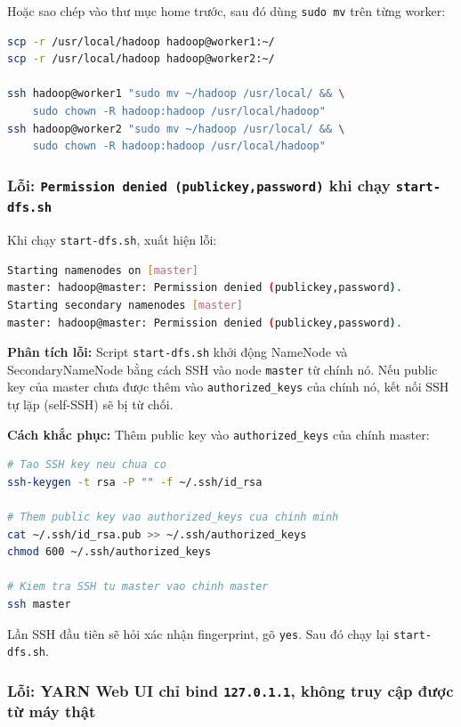 Hoặc sao chép vào thư mục home trước, sau đó dùng \texttt{sudo mv} trên từng worker:

\begin{lstlisting}[language=bash, numbers=none]
scp -r /usr/local/hadoop hadoop@worker1:~/
scp -r /usr/local/hadoop hadoop@worker2:~/

ssh hadoop@worker1 "sudo mv ~/hadoop /usr/local/ && \
    sudo chown -R hadoop:hadoop /usr/local/hadoop"
ssh hadoop@worker2 "sudo mv ~/hadoop /usr/local/ && \
    sudo chown -R hadoop:hadoop /usr/local/hadoop"
\end{lstlisting}

\subsubsection{Lỗi: \texttt{Permission denied (publickey,password)} khi chạy \texttt{start-dfs.sh}}

Khi chạy \texttt{start-dfs.sh}, xuất hiện lỗi:

\begin{lstlisting}[language=bash, numbers=none]
Starting namenodes on [master]
master: hadoop@master: Permission denied (publickey,password).
Starting secondary namenodes [master]
master: hadoop@master: Permission denied (publickey,password).
\end{lstlisting}

\textbf{Phân tích lỗi:} Script \texttt{start-dfs.sh} khởi động NameNode và SecondaryNameNode bằng cách SSH vào node \texttt{master} từ chính nó. Nếu public key của master chưa được thêm vào \texttt{authorized\_keys} của chính nó, kết nối SSH tự lặp (self-SSH) sẽ bị từ chối.

\textbf{Cách khắc phục:} Thêm public key vào \texttt{authorized\_keys} của chính master:

\begin{lstlisting}[language=bash, numbers=none]
# Tao SSH key neu chua co
ssh-keygen -t rsa -P "" -f ~/.ssh/id_rsa

# Them public key vao authorized_keys cua chinh minh
cat ~/.ssh/id_rsa.pub >> ~/.ssh/authorized_keys
chmod 600 ~/.ssh/authorized_keys

# Kiem tra SSH tu master vao chinh master
ssh master
\end{lstlisting}

Lần SSH đầu tiên sẽ hỏi xác nhận fingerprint, gõ \texttt{yes}. Sau đó chạy lại \texttt{start-dfs.sh}.

\subsubsection{Lỗi: YARN Web UI chỉ bind \texttt{127.0.1.1}, không truy cập được từ máy thật}

